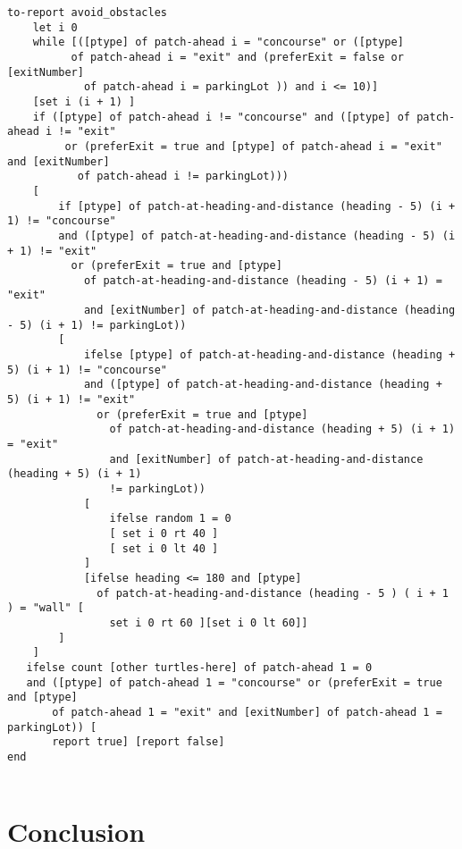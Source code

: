 \documentclass{article}
\begin{document}
\begin{lstlisting}
to-report avoid_obstacles
    let i 0
    while [([ptype] of patch-ahead i = "concourse" or ([ptype] 
          of patch-ahead i = "exit" and (preferExit = false or [exitNumber] 
            of patch-ahead i = parkingLot )) and i <= 10)]
    [set i (i + 1) ]
    if ([ptype] of patch-ahead i != "concourse" and ([ptype] of patch-ahead i != "exit"
         or (preferExit = true and [ptype] of patch-ahead i = "exit" and [exitNumber] 
           of patch-ahead i != parkingLot)))
    [
        if [ptype] of patch-at-heading-and-distance (heading - 5) (i + 1) != "concourse" 
        and ([ptype] of patch-at-heading-and-distance (heading - 5) (i + 1) != "exit" 
          or (preferExit = true and [ptype] 
            of patch-at-heading-and-distance (heading - 5) (i + 1) = "exit" 
            and [exitNumber] of patch-at-heading-and-distance (heading - 5) (i + 1) != parkingLot))
        [
            ifelse [ptype] of patch-at-heading-and-distance (heading + 5) (i + 1) != "concourse" 
            and ([ptype] of patch-at-heading-and-distance (heading + 5) (i + 1) != "exit" 
              or (preferExit = true and [ptype] 
                of patch-at-heading-and-distance (heading + 5) (i + 1) = "exit" 
                and [exitNumber] of patch-at-heading-and-distance (heading + 5) (i + 1) 
                != parkingLot))
            [ 
                ifelse random 1 = 0
                [ set i 0 rt 40 ]
                [ set i 0 lt 40 ]
            ]
            [ifelse heading <= 180 and [ptype] 
              of patch-at-heading-and-distance (heading - 5 ) ( i + 1 ) = "wall" [
                set i 0 rt 60 ][set i 0 lt 60]]
        ]
    ]
   ifelse count [other turtles-here] of patch-ahead 1 = 0  
   and ([ptype] of patch-ahead 1 = "concourse" or (preferExit = true and [ptype] 
       of patch-ahead 1 = "exit" and [exitNumber] of patch-ahead 1 = parkingLot)) [
       report true] [report false]
end


\end{lstlisting}


\section{Conclusion}




\cite{hopkins}


\end{document}
